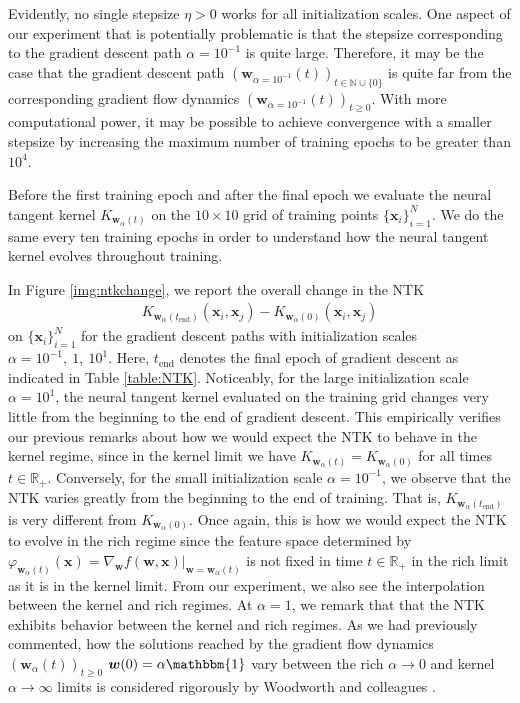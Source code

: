 \documentclass{article}
\begin{document}
Evidently, no single stepsize $\eta > 0$ works for all initialization scales. One aspect of our experiment that is potentially problematic is that the stepsize corresponding to the gradient descent path $\alpha = 10^{-1}$ is quite large. Therefore, it may be the case that the gradient descent path $(\boldsymbol{w}_{\alpha = 10^{-1}}(t))_{t \in \mathbb{N} \cup \{ 0 \}}$ is quite far from the corresponding gradient flow dynamics $(\boldsymbol{w}_{\alpha = 10^{-1}}(t))_{t\geq 0}$. With more computational power, it may be possible to achieve convergence with a smaller stepsize by increasing the maximum number of training epochs to be greater than $10^4$.

Before the first training epoch and after the final epoch we evaluate the neural tangent kernel $K_{\boldsymbol{w}_{\alpha}(t)}$ on the $10 \times 10$ grid of training points $\{ \boldsymbol{x}_i \}_{i=1}^N$. We do the same every ten training epochs in order to understand how the neural tangent kernel evolves throughout training.

In Figure \ref{img:ntkchange}, we report the overall change in the NTK
\begin{align*}
   K_{\boldsymbol{w}_{\alpha}(t_{\text{end}})}(\boldsymbol{x}_i, \boldsymbol{x}_j) -  K_{\boldsymbol{w}_{\alpha}(0)}(\boldsymbol{x}_i, \boldsymbol{x}_j)
\end{align*}
on $\{ \boldsymbol{x}_i \}_{i=1}^N$ for the gradient descent paths with initialization scales $\alpha = 10^{-1}, \ 1, \ 10^1$. Here, $t_{\text{end}}$ denotes the final epoch of gradient descent as indicated in Table \ref{table:NTK}. Noticeably, for the large initialization scale $\alpha = 10^1$, the neural tangent kernel evaluated on the training grid changes very little from the beginning to the end of gradient descent. This empirically verifies our previous remarks about how we would expect the NTK to behave in the kernel regime, since in the kernel limit we have $K_{\boldsymbol{w}_{\alpha}(t)} = K_{\boldsymbol{w}_{\alpha}(0)}$ for all times $t \in \mathbb{R}_+$. Conversely, for the small initialization scale $\alpha = 10^{-1}$, we observe that the NTK varies greatly from the beginning to the end of training. That is, $K_{\boldsymbol{w}_{\alpha}(t_{\text{end}})}$ is very different from $K_{\boldsymbol{w}_{\alpha}(0)}$. Once again, this is how we would expect the NTK to evolve in the rich regime since the feature space determined by $\varphi_{\boldsymbol{w}_{\alpha}(t)}(\boldsymbol{x}) = \nabla_{\boldsymbol{w}}f(\boldsymbol{w}, \boldsymbol{x})|_{\boldsymbol{w} = \boldsymbol{w}_{\alpha}(t)}$ is not fixed in time $t \in \mathbb{R}_+$ in the rich limit as it is in the kernel limit. From our experiment, we also see the interpolation between the kernel and rich regimes. At $\alpha = 1$, we remark that that the NTK exhibits behavior between the kernel and rich regimes. As we had previously commented, how the solutions reached by the gradient flow dynamics $(\boldsymbol{w}_{\alpha}(t))_{t \geq 0}$ $\boldsymbol{w}(0) = \alpha \mathbbm{1}$ vary between the rich $\alpha \rightarrow 0$ and kernel $\alpha \rightarrow \infty$ limits is considered rigorously by Woodworth and colleagues \cite{woodworth2020kernel}.
\end{document}
